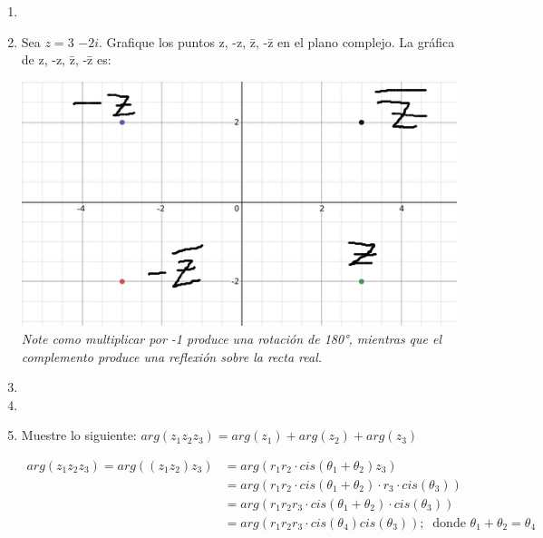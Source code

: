 \documentclass[a4paper,12pt]{article}
\begin{document}
\begin{enumerate}
            (ii) Soluciones de forma polar
            
            Como $z^{4} = r^{4}cis(4\theta) = 16cis(4\theta) = 16cis(0) = 16$, al ser representarse geométricamente $z^{4}$ como un vector con ángulo 0, por definición también tiene un ángulo igual a $2\pi$, de manera que $4\theta = 2\pi$ y por lo tanto $\theta = \pi/2$, de manera que $z = 2cis(\theta) = 2cis(\pi/2) = 2i$. Siguiendo esta misma idea, $z^{4}$ también tiene un ángulo igual a $4\pi$, de manera que $4\theta = 4\pi$ y por lo tanto $\theta = \pi$, y en consecuencia, $z = 2cis(\theta) = 2cis(\pi) = -2i$. En consecuencia, $z=2i$ y $z=-2i$.

        
        \item
            
        \item Sea $z = 3$ $-2i$. Grafique los puntos z, -z, \={z}, -\={z}  en el plano complejo.
        La gráfica de z, -z, \={z}, -\={z} es:
            
            \begin{center}
                \includegraphics[width= 0.6\linewidth]{taller1_pto8.png}\\    
                \textit{Note como multiplicar por -1 produce una rotación de 180°, mientras que el complemento produce una reflexión sobre la recta real.}
            \end{center}
            
        \item 
        
        \item 
        
        \item Muestre lo siguiente:
            $arg(z_{1}z_{2}z_{3}) = arg(z_{1}) + arg(z_{2}) + arg(z_{3})$
    
            \begin{align*}
                arg(z_{1}z_{2}z_{3}) = arg((z_{1}z_{2})z_{3}) &= arg(r_{1}r_{2}\cdot cis(\theta_{1} + \theta_{2})z_{3})\\
                &= arg( r_{1}r_{2}\cdot cis(\theta_{1} + \theta_{2})\cdot r_{3} \cdot cis(\theta_{3}))\\
                &= arg( r_{1}r_{2}r_{3} \cdot cis(\theta_{1} + \theta_{2}) \cdot cis(\theta_{3}))\\
                &= arg( r_{1}r_{2}r_{3} \cdot cis(\theta_{4})cis(\theta_{3})); \;\; \text{donde $\theta_{1}+\theta_{2} = \theta_{4}$}
            \end{align*}


\end{enumerate}
\end{document}
